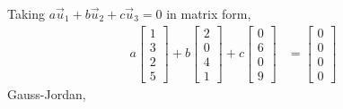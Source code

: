 \documentclass[a4paper,norsk,12pt]{article}
\begin{document}
Taking $a\vec{u}_1 + b\vec{u}_2 + c\vec{u}_3 = 0$ in matrix form,
\begin{align*}
  a
    \left[
      \begin{array}{c}
        1 \\ 3 \\ 2 \\ 5
      \end{array}
    \right]
  + b
    \left[
      \begin{array}{c}
        2 \\ 0 \\ 4 \\ 1
      \end{array}
    \right]
  + c
    \left[
      \begin{array}{c}
        0 \\ 6 \\ 0 \\ 9
      \end{array}
    \right]
  &=
    \left[
      \begin{array}{c}
        0 \\ 0 \\ 0 \\ 0
      \end{array}
    \right]
\end{align*}
Gauss-Jordan,
\end{document}
